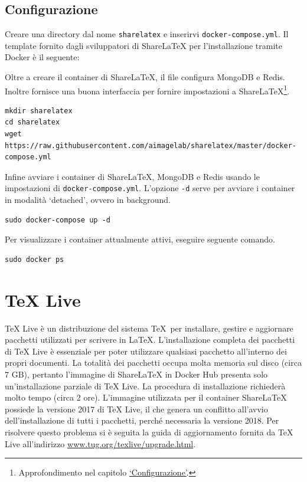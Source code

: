 \subsection{Configurazione}
Creare una directory dal nome \verb|sharelatex| e inserirvi \verb|docker-compose.yml|. Il template fornito dagli sviluppatori di ShareLaTeX per l'installazione tramite Docker è il seguente:

Oltre a creare il container di ShareLaTeX, il file configura MongoDB e Redis. Inoltre fornisce una buona interfaccia per fornire impostazioni a ShareLaTeX\footnote{Approfondimento nel capitolo \hyperref[Configurazione]{\enquote*{Configurazione}}.}.
\begin{lstlisting}
mkdir sharelatex
cd sharelatex
wget https://raw.githubusercontent.com/aimagelab/sharelatex/master/docker-compose.yml
\end{lstlisting}
Infine avviare i container di ShareLaTeX, MongoDB e Redis usando le impostazioni di \verb|docker-compose.yml|. L'opzione \verb|-d| serve per avviare i container in modalità \enquote*{detached}, ovvero in background.
\begin{lstlisting}
sudo docker-compose up -d
\end{lstlisting}
Per visualizzare i container attualmente attivi, eseguire seguente comando.
\begin{lstlisting}
sudo docker ps
\end{lstlisting}

\section{TeX Live}
TeX Live è un distribuzione del sistema \TeX ~per installare, gestire e aggiornare pacchetti utilizzati per scrivere in \LaTeX. L'installazione completa dei pacchetti di TeX Live è essenziale per poter utilizzare qualsiasi pacchetto all'interno dei propri documenti. La totalità dei pacchetti occupa molta memoria sul disco (circa 7 GB), pertanto l'immagine di ShareLaTeX in Docker Hub presenta solo un'installazione parziale di TeX Live. La procedura di installazione richiederà molto tempo (circa 2 ore). L'immagine utilizzata per il container ShareLaTeX possiede la versione 2017 di TeX Live, il che genera un conflitto all'avvio dell'installazione di tutti i pacchetti, perché necessaria la versione 2018. Per risolvere questo problema si è seguita la guida di aggiornamento fornita da TeX Live all'indirizzo \url{www.tug.org/texlive/upgrade.html}.

